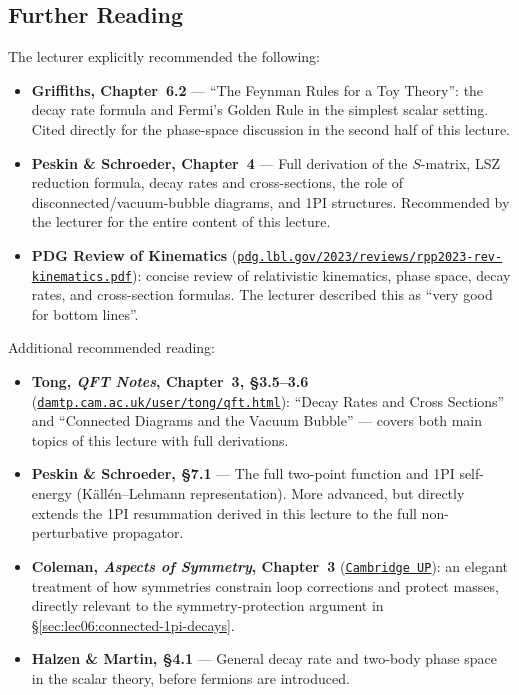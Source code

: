\documentclass[../main.tex]{subfiles}
\begin{document}
\subsection*{Further Reading}

The lecturer explicitly recommended the following:

\begin{itemize}
  \item \textbf{Griffiths, Chapter~6.2} — ``The Feynman Rules for a Toy Theory'':
    the decay rate formula and Fermi's Golden Rule in the simplest scalar setting.
    Cited directly for the phase-space discussion in the second half of this lecture.

  \item \textbf{Peskin \& Schroeder, Chapter~4} — Full derivation of the $S$-matrix,
    LSZ reduction formula, decay rates and cross-sections, the role of
    disconnected/vacuum-bubble diagrams, and 1PI structures.  Recommended by the
    lecturer for the entire content of this lecture.

  \item \textbf{PDG Review of Kinematics}
    (\href{https://pdg.lbl.gov/2023/reviews/rpp2023-rev-kinematics.pdf}{\texttt{pdg.lbl.gov/2023/reviews/rpp2023-rev-kinematics.pdf}}):
    concise review of relativistic kinematics, phase space, decay rates, and
    cross-section formulas.  The lecturer described this as ``very good for bottom
    lines''.
\end{itemize}

Additional recommended reading:

\begin{itemize}
  \item \textbf{Tong, \textit{QFT Notes}, Chapter~3, \S3.5--3.6}
    (\href{https://www.damtp.cam.ac.uk/user/tong/qft.html}{\texttt{damtp.cam.ac.uk/user/tong/qft.html}}):
    ``Decay Rates and Cross Sections'' and ``Connected Diagrams and the Vacuum
    Bubble'' — covers both main topics of this lecture with full derivations.

  \item \textbf{Peskin \& Schroeder, \S7.1} — The full two-point function and 1PI
    self-energy (Källén--Lehmann representation).  More advanced, but directly
    extends the 1PI resummation derived in this lecture to the full non-perturbative
    propagator.

  \item \textbf{Coleman, \textit{Aspects of Symmetry}, Chapter~3}
    (\href{https://www.cambridge.org/core/books/aspects-of-symmetry/}{\texttt{Cambridge UP}}):
    an elegant treatment of how symmetries constrain loop corrections and protect
    masses, directly relevant to the symmetry-protection argument in \S\ref{sec:lec06:connected-1pi-decays}.

  \item \textbf{Halzen \& Martin, \S4.1} — General decay rate and two-body
    phase space in the scalar theory, before fermions are introduced.
\end{itemize}
\end{document}

